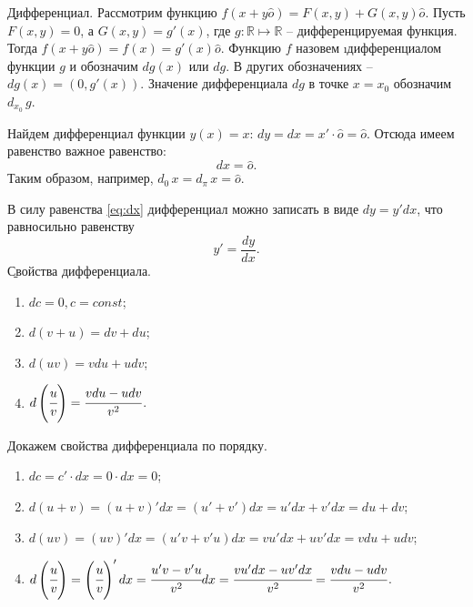 \b{Дифференциал.} Рассмотрим функцию $f(x+y\hat{o})=F(x, y)+G(x, y)\hat{o}$. Пусть $F(x, y)=0$, а $G(x, y)=g'(x)$, где $g: \mathbb{R}\longmapsto\mathbb{R}$ -- дифференцируемая функция. Тогда $f(x+y\hat{o})=f(x)=g'(x)\hat{o}$. Функцию $f$ назовем \i{дифференциалом функции $g$} и обозначим $dg(x)$ или $dg$. В других обозначениях -- $dg(x)=(0, g'(x))$. Значение дифференциала $dg$ в точке $x=x_0$ обозначим $d_{x_0}\,g$.
\begin{example}
	Найдем дифференциал функции $y(x)=x$: $dy=dx=x'\cdot\hat{o}=\hat{o}$. Отсюда имеем равенство важное равенство:
	\begin{equation}\label{eq:dx}
		dx=\hat{o}.
	\end{equation}
	Таким образом, например, $d_{0}\,x=d_{\pi}\,x=\hat{o}$.
\end{example}
В силу равенства \eqref{eq:dx} дифференциал можно записать в виде $dy=y'dx$, что равносильно равенству
	\begin{equation}
		y'=\frac{dy}{dx}.
	\end{equation}
\b{Свойства дифференциала.}
\begin{enumerate}
	\item $dc=0, c=const$;
	\item $d(v+u)=dv+du$;
	\item $d(uv)=vdu+udv$;
	\item $d\left({\cfrac{u}{v}}\right)=\cfrac{vdu-udv}{v^2}$.
\end{enumerate}
Докажем свойства дифференциала по порядку.
\begin{enumerate}
	\item $dc=c'\cdot dx=0\cdot dx=0$;
	\item $d(u+v)=(u+v)'dx=(u'+v')dx=u'dx+v'dx=du+dv$;
	\item $d(uv)=(uv)'dx=(u'v+v'u)dx=vu'dx+uv'dx=vdu+udv$;
	\item $d\left({\cfrac{u}{v}}\right)=\left({\cfrac{u}{v}}\right)'dx=\cfrac{u'v-v'u}{v^2}dx=\cfrac{vu'dx-uv'dx}{v^2}=\cfrac{vdu-udv}{v^2}$.
\end{enumerate}